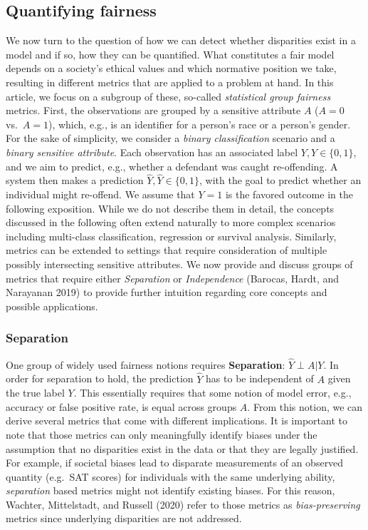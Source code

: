 \hypertarget{quantifying-fairness}{%
\subsection{Quantifying fairness}\label{quantifying-fairness}}

We now turn to the question of how we can detect whether disparities exist in a model and if so, how they can be quantified.
What constitutes a fair model depends on a society's ethical values and which normative position we take, resulting in different metrics that are applied to a problem at hand.
In this article, we focus on a subgroup of these, so-called \emph{statistical group fairness} metrics.
First, the observations are grouped by a sensitive attribute \(A\) (\(A = 0\) vs.~\(A = 1\)), which, e.g., is an identifier for a person's race or a person's gender.
For the sake of simplicity, we consider a \emph{binary classification} scenario and a \emph{binary sensitive attribute}.
Each observation has an associated label \(Y, Y \in \{0, 1\}\), and we aim to predict, e.g., whether a defendant was caught re-offending.
A system then makes a prediction \(\hat{Y}, \hat{Y} \in \{0,1\}\), with the goal to predict whether an individual might re-offend.
We assume that \(Y = 1\) is the favored outcome in the following exposition.
While we do not describe them in detail, the concepts discussed in the following often extend naturally to more complex scenarios including multi-class classification, regression or survival analysis.
Similarly, metrics can be extended to settings that require consideration of multiple possibly intersecting sensitive attributes.
We now provide and discuss groups of metrics that require either \emph{Separation} or \emph{Independence} (Barocas, Hardt, and Narayanan 2019) to provide further intuition regarding core concepts and possible applications.

\hypertarget{separation}{%
\subsubsection{Separation}\label{separation}}

One group of widely used fairness notions requires \textbf{Separation}: \(\hat{Y} \perp A | Y\).
In order for separation to hold, the prediction \(\hat{Y}\) has to be independent of \(A\) given the true label \(Y\).
This essentially requires that some notion of model error, e.g., accuracy or false positive rate, is equal across groups \(A\).
From this notion, we can derive several metrics that come with different implications.
It is important to note that those metrics can only meaningfully identify biases under the assumption that no disparities exist in the data or that they are legally justified.
For example, if societal biases lead to disparate measurements of an observed quantity (e.g.~SAT scores) for individuals with the same underlying ability, \emph{separation} based metrics might not identify existing biases.
For this reason, Wachter, Mittelstadt, and Russell (2020) refer to those metrics as \emph{bias-preserving} metrics since underlying disparities are not addressed.

